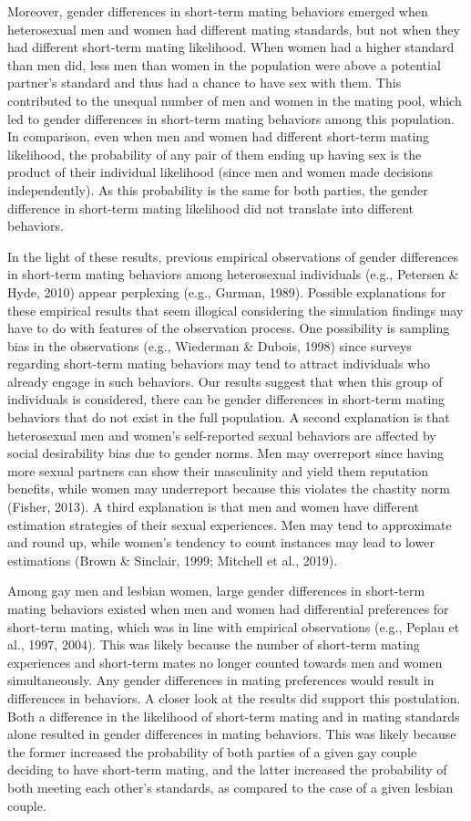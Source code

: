 \documentclass[
  11pt,
]{article}
\begin{document}
Moreover, gender differences in short-term mating behaviors emerged when
heterosexual men and women had different mating standards, but not when
they had different short-term mating likelihood. When women had a higher
standard than men did, less men than women in the population were above
a potential partner's standard and thus had a chance to have sex with
them. This contributed to the unequal number of men and women in the
mating pool, which led to gender differences in short-term mating
behaviors among this population. In comparison, even when men and women
had different short-term mating likelihood, the probability of any pair
of them ending up having sex is the product of their individual
likelihood (since men and women made decisions independently). As this
probability is the same for both parties, the gender difference in
short-term mating likelihood did not translate into different behaviors.

In the light of these results, previous empirical observations of gender
differences in short-term mating behaviors among heterosexual
individuals (e.g., Petersen \& Hyde, 2010) appear perplexing (e.g.,
Gurman, 1989). Possible explanations for these empirical results that
seem illogical considering the simulation findings may have to do with
features of the observation process. One possibility is sampling bias in
the observations (e.g., Wiederman \& Dubois, 1998) since surveys
regarding short-term mating behaviors may tend to attract individuals
who already engage in such behaviors. Our results suggest that when this
group of individuals is considered, there can be gender differences in
short-term mating behaviors that do not exist in the full population. A
second explanation is that heterosexual men and women's self-reported
sexual behaviors are affected by social desirability bias due to gender
norms. Men may overreport since having more sexual partners can show
their masculinity and yield them reputation benefits, while women may
underreport because this violates the chastity norm (Fisher, 2013). A
third explanation is that men and women have different estimation
strategies of their sexual experiences. Men may tend to approximate and
round up, while women's tendency to count instances may lead to lower
estimations (Brown \& Sinclair, 1999; Mitchell et al., 2019).

Among gay men and lesbian women, large gender differences in short-term
mating behaviors existed when men and women had differential preferences
for short-term mating, which was in line with empirical observations
(e.g., Peplau et al., 1997, 2004). This was likely because the number of
short-term mating experiences and short-term mates no longer counted
towards men and women simultaneously. Any gender differences in mating
preferences would result in differences in behaviors. A closer look at
the results did support this postulation. Both a difference in the
likelihood of short-term mating and in mating standards alone resulted
in gender differences in mating behaviors. This was likely because the
former increased the probability of both parties of a given gay couple
deciding to have short-term mating, and the latter increased the
probability of both meeting each other's standards, as compared to the
case of a given lesbian couple.
\end{document}
